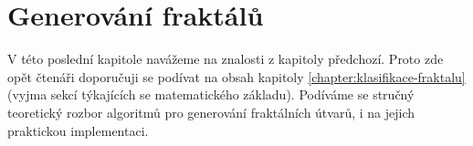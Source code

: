\chapter{Generování fraktálů}\label{chapter:generovani-fraktalu}

V této poslední kapitole navážeme na znalosti z kapitoly předchozí. Proto zde opět čtenáři doporučuji se podívat na obsah kapitoly \ref{chapter:klasifikace-fraktalu} (vyjma sekcí týkajících se matematického základu). Podíváme se stručný teoretický rozbor algoritmů pro generování fraktálních útvarů, i na jejich praktickou implementaci.




